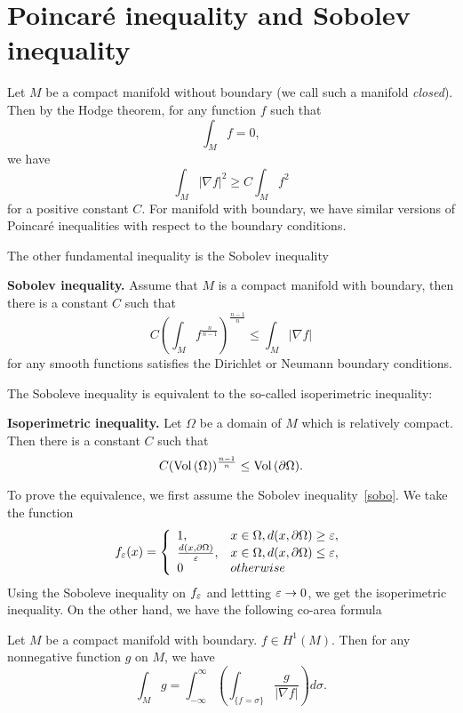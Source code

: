 \section{Poincar\'e inequality and Sobolev inequality}
Let $M$ be a compact manifold without boundary (we call such a manifold {\it closed}). Then by the Hodge theorem, for any function $f$ such that 
\[
\int_M f=0,
\]
we have
\[
\int_M|\nabla f|^2\geq C\int_M f^2
\]
for a positive constant $C$. For manifold with boundary, we have similar versions of Poincar\'e inequalities with respect to the boundary conditions.

 The other fundamental inequality is the Sobolev inequality
 
 {\bf Sobolev inequality.} Assume that $M$ is a compact manifold with boundary, then there is a constant $C$ such that
 \begin{equation}\label{sobo}
 C\left(\int_Mf^{\frac{n}{n-1}}\right)^{\frac{n-1}n}\leq\int_M|\nabla f|
 \end{equation}
 for any smooth functions satisfies the Dirichlet or Neumann boundary conditions.
 
 
The Soboleve inequality is equivalent to the so-called isoperimetric inequality:

{\bf Isoperimetric inequality.} Let $\Omega$ be a domain of $M$ which is relatively compact. Then
there is a constant $C$ such that
\begin{equation}\label{iso}
C({\rm Vol}\,(\Omega))^{\frac{n-1}{n}}\leq{\rm Vol}\,(\partial\Omega).
\end{equation}

To prove the equivalence,
we first assume the Sobolev inequality~\eqref{sobo}. We take the function
\[
f_\varepsilon(x)=\left\{
\begin{array}{ll}
1,& x\in\Omega, d(x,\partial\Omega)\geq\varepsilon,\\
\frac{d(x,\partial\Omega)}{\varepsilon}, & x\in\Omega, d(x,\partial\Omega)\leq\varepsilon,\\
0& otherwise
\end{array}
\right.
\]
Using the Soboleve inequality on $f_\varepsilon$ and lettting $\varepsilon\to 0$, we get the isoperimetric inequality. On the other hand, we have the following co-area formula

\begin{theorem} Let $M$ be a compact manifold with boundary. $f\in H^1(M)$. Then for any nonnegative function $g$ on $M$, we have
\[
\int_M g=\int_{-\infty}^\infty\left(\int_{\{f=\sigma\}}\frac{g}{|\nabla f|}\right)d\sigma.
\]
\end{theorem}


